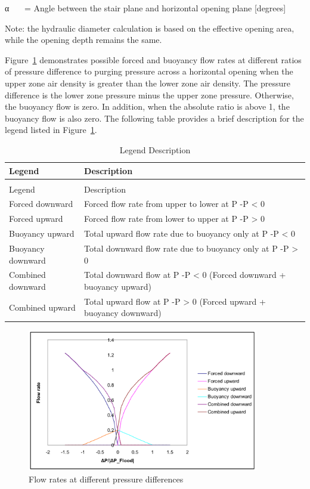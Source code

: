 α~~~ = Angle between the stair plane and horizontal opening plane {[}degrees{]}

Note: the hydraulic diameter calculation is based on the effective opening area, while the opening depth remains the same.

Figure~\ref{fig:flow-rates-at-different-pressure-differences} demonstrates possible forced and buoyancy flow rates at different ratios of pressure difference to purging pressure across a horizontal opening when the upper zone air density is greater than the lower zone air density. The pressure difference is the lower zone pressure minus the upper zone pressure. Otherwise, the buoyancy flow is zero. In addition, when the absolute ratio is above 1, the buoyancy flow is also zero. The following table provides a brief description for the legend listed in Figure~\ref{fig:flow-rates-at-different-pressure-differences}.

\begin{longtable}[c]{p{1.5in}p{4.5in}}
\caption{Legend Description \label{table:legend-description}} \tabularnewline
\toprule 
Legend & Description \tabularnewline
\midrule
\endfirsthead

\caption[]{Legend Description} \tabularnewline
\toprule 
Legend & Description \tabularnewline
\midrule
\endhead

Forced downward & Forced flow rate from upper to lower at P  -P    <  0 \tabularnewline
Forced upward & Forced flow rate from lower to upper at P  -P    >  0 \tabularnewline
Buoyancy upward & Total upward flow rate due to buoyancy only at P  -P    <  0 \tabularnewline
Buoyancy downward & Total downward flow rate due to buoyancy only at P  -P    >  0 \tabularnewline
Combined downward & Total downward flow at P  -P    <  0 (Forced downward + buoyancy upward) \tabularnewline
Combined upward & Total upward flow at P  -P    >  0 (Forced upward + buoyancy downward) \tabularnewline
\bottomrule
\end{longtable}

\begin{figure}[hbtp] %
\centering
\includegraphics[width=0.9\textwidth, height=0.9\textheight, keepaspectratio=true]{media/image2743.svg.png}
\caption{Flow rates at different pressure differences \protect \label{fig:flow-rates-at-different-pressure-differences}}
\end{figure}

